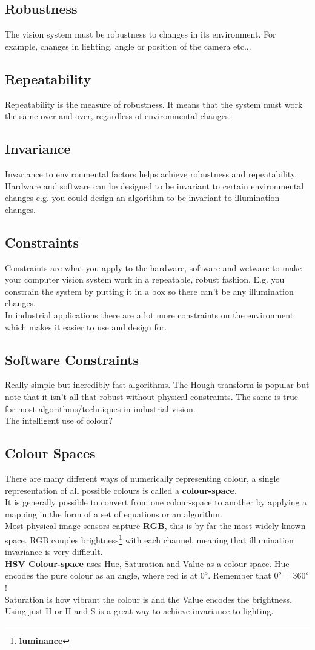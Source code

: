 \documentclass{article}
\begin{document}
	\subsection{Robustness}
	The vision system must be robustness to changes in its environment. For example, changes in lighting, angle or position of the camera etc...
	\subsection{Repeatability}
	Repeatability is the measure of robustness. It means that the system must work the same over and over, regardless of environmental changes.
	\subsection{Invariance}
	Invariance to environmental factors helps achieve robustness and repeatability. Hardware and software can be designed to be invariant to certain environmental changes e.g. you could design an algorithm to be invariant to illumination changes.
	\subsection{Constraints}
	Constraints are what you apply to the hardware, software and wetware to make your computer vision system work in a repeatable, robust fashion. E.g. you constrain the system by putting it in a box so there can't be any illumination changes.\\
	In industrial applications there are a lot more constraints on the environment which makes it easier to use and design for.
	\subsection{Software Constraints}
	Really simple but incredibly fast algorithms. The Hough transform is popular but note that it isn't all that robust without physical constraints. The same is true for most algorithms/techniques in industrial vision.\\
	The intelligent use of colour?
	\subsection{Colour Spaces}
	There are many different ways of numerically representing colour, a single representation of all possible colours is called a \textbf{colour-space}.\\
	It is generally possible to convert from one colour-space to another by applying a mapping in the form of a set of equations or an algorithm.\\
	Most physical image sensors capture \textbf{RGB}, this is by far the most widely known space. RGB couples brightness\footnote{\textbf{luminance}} with each channel, meaning that illumination invariance is very difficult.\\
	\textbf{HSV Colour-space} uses Hue, Saturation and Value as a colour-space. Hue encodes the pure colour as an angle, where red is at $0^o$. Remember that $0^o=360^o$!\\
	Saturation is how vibrant the colour is and the Value encodes the brightness. Using just H or H and S is a great way to achieve invariance to lighting.
\end{document}
